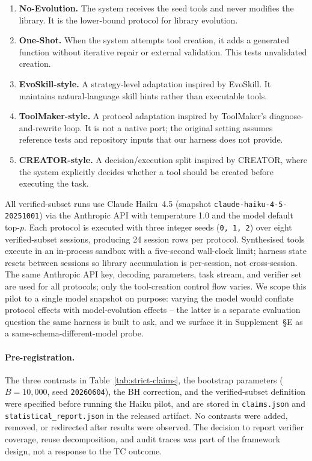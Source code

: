 \documentclass[sigconf,anonymous,natbib=false]{acmart}
\begin{document}
\begin{enumerate}[leftmargin=1.2em]
  \item \textbf{No-Evolution.} The system receives the seed tools and never modifies the library. It is the lower-bound protocol for library evolution.
  \item \textbf{One-Shot.} When the system attempts tool creation, it adds a generated function without iterative repair or external validation. This tests unvalidated creation.
  \item \textbf{EvoSkill-style.} A strategy-level adaptation inspired by EvoSkill. It maintains natural-language skill hints rather than executable tools.
  \item \textbf{ToolMaker-style.} A protocol adaptation inspired by ToolMaker's diagnose-and-rewrite loop. It is not a native port; the original setting assumes reference tests and repository inputs that our harness does not provide.
  \item \textbf{CREATOR-style.} A decision/execution split inspired by CREATOR, where the system explicitly decides whether a tool should be created before executing the task.
\end{enumerate}

All verified-subset runs use Claude Haiku~4.5 (snapshot \texttt{claude-haiku-4-5-20251001}) via the Anthropic API with temperature 1.0 and the model default top-$p$. Each protocol is executed with three integer seeds (\texttt{0, 1, 2}) over eight verified-subset sessions, producing 24 session rows per protocol. Synthesised tools execute in an in-process sandbox with a five-second wall-clock limit; harness state resets between sessions so library accumulation is per-session, not cross-session. The same Anthropic API key, decoding parameters, task stream, and verifier set are used for all protocols; only the tool-creation control flow varies. We scope this pilot to a single model snapshot on purpose: varying the model would conflate protocol effects with model-evolution effects -- the latter is a separate evaluation question the same harness is built to ask, and we surface it in Supplement~\S E as a same-schema-different-model probe.

\paragraph{Pre-registration.}
The three contrasts in Table~\ref{tab:strict-claims}, the bootstrap parameters ($B{=}10{,}000$, seed \texttt{20260604}), the BH correction, and the verified-subset definition were specified before running the Haiku pilot, and are stored in \texttt{claims.json} and \texttt{statistical\_report.json} in the released artifact. No contrasts were added, removed, or redirected after results were observed. The decision to report verifier coverage, reuse decomposition, and audit traces was part of the framework design, not a response to the TC outcome.
\end{document}
